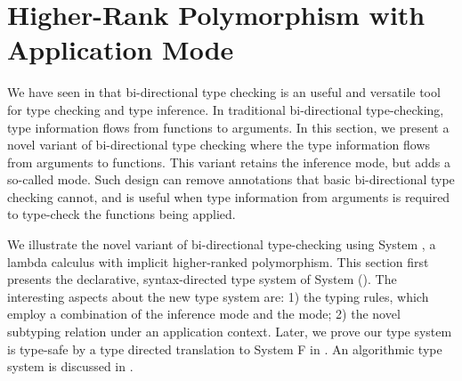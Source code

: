 \chapter{Higher-Rank Polymorphism with Application Mode}
\label{chap:BiDirectional}

We have seen in  that bi-directional type checking is an
useful and versatile tool for type checking and type inference. In traditional
bi-directional type-checking, type information flows from functions to
arguments. In this section, we present a novel variant of bi-directional type
checking where the type information flows from arguments to functions. This
variant retains the inference mode, but adds a so-called \textit{\mode} mode.
Such design can remove annotations that basic bi-directional type checking
cannot, and is useful when type information from arguments is required to
type-check the functions being applied.

We illustrate the novel variant of bi-directional type-checking using System
\ap, a lambda calculus with implicit higher-ranked polymorphism. This section
first presents the declarative, syntax-directed type system of System \ap
(). The interesting aspects about the new type system
are: 1) the typing rules, which employ a combination of the inference mode and
the \textit{\mode} mode; 2) the novel subtyping relation under an application
context. Later, we prove our type system is type-safe by a type directed
translation to System F in . An algorithmic type system
is discussed in .











